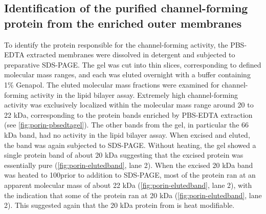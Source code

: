 \subsection{Identification of the purified channel-forming protein from the enriched outer membranes} 
To identify the protein responsible for the channel-forming activity, the \ac{PBS}-\ac{EDTA} extracted membranes were dissolved in detergent and subjected to preparative \ac{SDS-PAGE}. The gel was cut into thin slices, corresponding to defined molecular mass ranges, and each was eluted overnight with a buffer containing 1\% Genapol. The eluted molecular mass fractions were examined for channel-forming activity in the lipid bilayer assay. Extremely high channel-forming activity was exclusively localized within the molecular mass range around 20 to 22 kDa, corresponding to the protein bands enriched by \ac{PBS}-\ac{EDTA} extraction (see \cref{fig:porin-pbsedtagel}). The other bands from the gel, in particular the 66 kDa band, had no activity in the lipid bilayer assay. When excised and eluted, the band was again subjected to \ac{SDS-PAGE}. Without heating, the gel showed a single protein band of about 20 kDa suggesting that the excised protein was essentially pure (\cref{fig:porin-elutedband}, lane 2). When the excised 20 kDa band was heated to 100\cel prior to addition to \ac{SDS-PAGE}, most of the protein ran at an apparent molecular mass of about 22 kDa (\cref{fig:porin-elutedband}, lane 2), with the indication that some of the protein ran at 20 kDa (\cref{fig:porin-elutedband}, lane 2). This suggested again that the 20 kDa protein from \caulobacter is heat modifiable.

